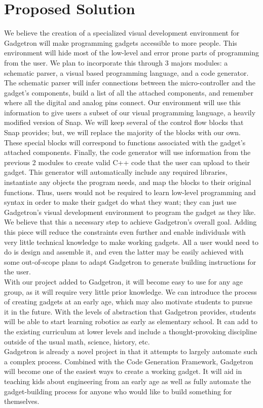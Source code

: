 \documentclass[12pt]{article}
\begin{document}
\section{Proposed Solution}
 We believe the creation of a specialized visual development environment for Gadgetron will make programming gadgets accessible to more people. This environment will hide most of the low-level and error prone parts of programming from the user. We plan to incorporate this through 3 majors modules: a schematic parser, a visual based programming language, and a code generator. The schematic parser will infer connections between the micro-controller and the gadget's components, build a list of all the attached components, and remember where all the digital and analog pins connect. Our environment will use this information to give users a subset of our visual programming language, a heavily modified version of Snap. We will keep several of the control flow blocks that Snap provides; but, we will replace the majority of the blocks with our own. These special blocks will correspond to functions associated with the gadget's attached components. Finally, the code generator will use information from the previous 2 modules to create valid C++ code that the user can upload to their gadget. This generator will automatically include any required libraries, instantiate any objects the program needs, and map the blocks to their original functions. Thus, users would not be required to learn low-level programming and syntax in order to make their gadget do what they want; they can just use Gadgetron's visual development environment to program the gadget as they like. We believe that this a necessary step to achieve Gadgetron's overall goal. Adding this piece will reduce the constraints even further and enable individuals with very little technical knowledge to make working gadgets. All a user would need to do is design and assemble it, and even the latter may be easily achieved with some out-of-scope plans to adapt Gadgetron to generate building instructions for the user. \\[7pt]
With our project added to Gadgetron, it will become easy to use for any age group, as it will require very little prior knowledge. We can introduce the process of creating gadgets at an early age, which may also motivate students to pursue it in the future. With the levels of abstraction that Gadgetron provides, students will be able to start learning robotics as early as elementary school. It can add to the existing curriculum at lower levels and include a thought-provoking discipline outside of the usual math, science, history, etc.\\[7pt]
Gadgetron is already a novel project in that it attempts to largely automate such a complex process. Combined with the Code Generation Framework, Gadgetron will become one of the easiest ways to create a working gadget. It will aid in teaching kids about engineering from an early age as well as fully automate the gadget-building process for anyone who would like to build something for themselves.
\end{document}

